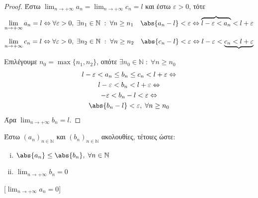 \documentclass[main.tex]{subfiles}
\begin{document}
\begin{proof}
\item {}
    Έστω $ \lim_{n \to +\infty} a_{n} = \lim_{n \to +\infty} c_{n} = l $ και 
    έστω $ \varepsilon >0 $, τότε
    \[ \lim_{n \to +\infty} a_{n} = l \Leftrightarrow \forall 
    \varepsilon >0, \; \exists n_{1} \in \mathbb{N} \; : \; \forall n 
    \geq n_{1} \quad \abs{a_{n} - l} < \varepsilon \Leftrightarrow 
    \overbrace{l - \varepsilon < a_{n}} < l + \varepsilon \] 

    \[ \lim_{n \to +\infty} c_{n} = l \Leftrightarrow \forall 
    \varepsilon >0, \; \exists n_{2} 
    \in \mathbb{N} \; : \; \forall n \geq n_{2} \quad \abs{c_{n} - l} 
    < \varepsilon \Leftrightarrow 
    l - \varepsilon < \underbrace{c_{n} < l + \varepsilon} \]

    Επιλέγουμε $ n_{0} = \max \{ n_{1}, n_{2} \} $, οπότε 
    $ \exists n_{0} \in \mathbb{N} \; : \; 
    \forall n \geq n_{0} $
    \begin{gather*}
        l - \varepsilon < a_{n} \leq b_{n} \leq c_{n} < l + 
        \varepsilon \Leftrightarrow \\
        l - \varepsilon < b_{n} < l + \varepsilon \Leftrightarrow \\
        - \varepsilon < b_{n} - l < \varepsilon \Leftrightarrow \\
        \abs{b_{n}-l} < \varepsilon, \; \forall n \geq n_{0}
    \end{gather*}
    Άρα $ \lim_{n \to +\infty} b_{n} = l $.
\end{proof}

\begin{cor}
    Έστω $ (a_{n})_{n \in \mathbb{N}} $ και $ 
    (b_{n})_{n \in \mathbb{N}} $ ακολουθίες, τέτοιες ώστε: 

    \vspace{\baselineskip}

    \begin{minipage}{0.25\textwidth}
        \begin{enumerate}[i)]
            \item $ \abs{a_{n}} \leq \abs{b_{n}}, \; \forall n \in 
                \mathbb{N} $ \hfill {}
            \item $ \lim_{n \to +\infty} b_{n} = 0$ \hfill {}
        \end{enumerate}
    \end{minipage}

    [$ \lim_{n \to +\infty} a_{n} = 0 $]
\end{cor}
\end{document}
